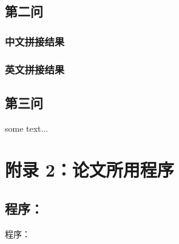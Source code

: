 \documentclass[12pt]{article}
\begin{document}
 \subsection{第二问}
    \subsubsection{中文拼接结果}
    \subsubsection{英文拼接结果}
 \subsection{第三问}
  some text...

  {\centering\section{附录 2：论文所用程序}}
  \subsection{程序：}
  程序：
\end{document}

